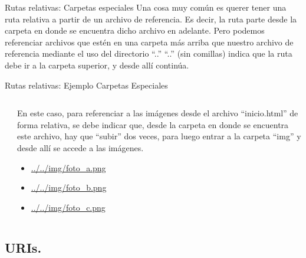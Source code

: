 
\begin{frame}{Rutas relativas: Carpetas especiales}
 Una cosa muy común es querer tener una ruta relativa a partir de un archivo
 de referencia.
 \jump
 Es decir, la ruta parte desde la carpeta en donde se encuentra dicho archivo en adelante.
 \jump
 Pero podemos referenciar archivos que estén en una carpeta más arriba que nuestro archivo
 de referencia mediante el uso del directorio ``..''
 \jump
 ``..'' (sin comillas) indica que la ruta debe ir a la carpeta superior, y desde
 allí continúa.
\end{frame}


\begin{frame}{Rutas relativas: Ejemplo Carpetas Especiales}
  \begin{columns}
    \begin{column}{0.5\textwidth}
    \end{column}
    \begin{column}{0.5\textwidth}
      En este caso, para referenciar a las imágenes desde el archivo ``inicio.html''
      de forma relativa, se debe indicar que, desde la carpeta en donde se encuentra
      este archivo, hay que ``subir'' dos veces, para luego entrar a la
      carpeta ``img'' y desde allí se accede a las imágenes.
      \begin{itemize}
        \item \url{../../img/foto_a.png}
        \item \url{../../img/foto_b.png}
        \item \url{../../img/foto_c.png}
      \end{itemize}
    \end{column}
  \end{columns}
\end{frame}


\subsection{URIs.}



